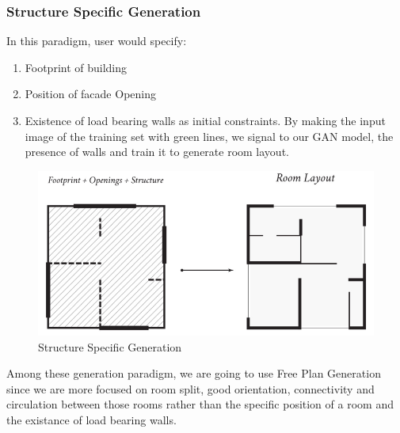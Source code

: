                         \subsubsection{Structure Specific Generation}
                                In this paradigm, user would specify: 
                                \begin{enumerate}[label=\alph*.]
                                        \item Footprint of building 
                                        \item Position of facade Opening 
                                        \item Existence of load bearing walls as initial constraints. By making the input image of the training set with green lines, we signal to our GAN model, the presence of walls and train it to generate room layout.
                                \end{enumerate}
                                \begin{figure}[h]
                                        \centering
                                        \includegraphics[width=1\textwidth]{img/chapter_6/structureSpecificGeneration.png}
                                        \caption{Structure Specific Generation}
                                        \label{fig: Structure Specific Generation}
                                \end{figure}
                                \pagebreak
                                Among these generation paradigm, we are going to use Free Plan Generation since we are more focused on room split, good orientation, connectivity and circulation between those rooms rather than the specific position of a room and the existance of load bearing walls.
